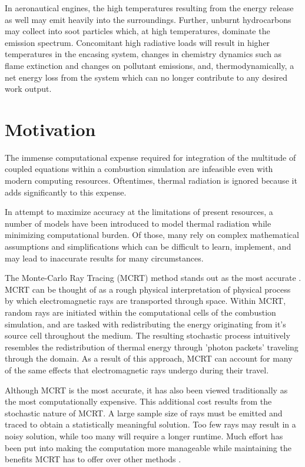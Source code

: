 In aeronautical engines, the high temperatures resulting from the energy release as well may emit heavily into the surroundings. Further, unburnt hydrocarbons may collect into soot particles which, at high temperatures, dominate the emission spectrum.
Concomitant high radiative loads will result in higher temperatures in the encasing system, changes in chemistry dynamics such as flame extinction and changes on pollutant emissions, and, thermodynamically, a net energy loss from the system which can no longer contribute to any desired work output.


\section{Motivation}
The immense computational expense required for integration of the multitude of coupled equations within a combustion simulation are infeasible even with modern computing resources. Oftentimes, thermal radiation is ignored because it adds significantly to this expense.

In attempt to maximize accuracy at the limitations of present resources, a number of models have been introduced to model thermal radiation while minimizing computational burden.
Of those, many rely on complex mathematical assumptions and simplifications which can be difficult to learn, implement, and may lead to inaccurate results for many circumstances. 


The Monte-Carlo Ray Tracing (MCRT) method stands out as the most accurate \cite{Tesse2002RadiativeApproach,Modest2013RadiativeTransfer,Coelho2018RadiativeSystems}. 
MCRT can be thought of as a rough physical interpretation of physical process by which electromagnetic rays are transported through space.
Within MCRT, random rays are initiated within the computational cells of the combustion simulation, and are tasked with redistributing the energy originating from it's source cell throughout the medium. The resulting stochastic process intuitively resembles the redistribution of thermal energy through 'photon packets' traveling through the domain.
As a result of this approach, MCRT can account for many of the same effects that electromagnetic rays undergo during their travel.

Although MCRT is the most accurate, it has also been viewed traditionally as the most computationally expensive.
This additional cost results from the stochastic nature of MCRT. A large sample size of rays must be emitted and traced to obtain a statistically meaningful solution. 
Too few rays may result in a noisy solution, while too many will require a longer runtime.
Much effort has been put into making the computation more manageable while maintaining the benefits MCRT has to offer over other methods \cite{Liu2020TheFlames,Tesse2002RadiativeApproach,Zeeb2001AnGeometries,Modest2003BackwardTransfer,Howell2010ThermalTransfer}.


